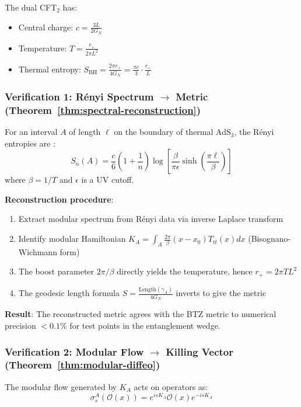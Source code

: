 \documentclass[12pt,a4paper]{article}
\begin{document}
The dual CFT$_2$ has:
\begin{itemize}
    \item Central charge: $c = \frac{3L}{2G_N}$
    \item Temperature: $T = \frac{r_+}{2\pi L^2}$
    \item Thermal entropy: $S_{\text{BH}} = \frac{2\pi r_+}{4G_N} = \frac{\pi c}{3} \cdot \frac{r_+}{L}$
\end{itemize}

\subsubsection{Verification 1: R\'enyi Spectrum $\to$ Metric (Theorem~\ref{thm:spectral-reconstruction})}

For an interval $A$ of length $\ell$ on the boundary of thermal AdS$_3$, the R\'enyi entropies are \cite{calabrese2009}:
\begin{equation}
S_n(A) = \frac{c}{6}\left(1 + \frac{1}{n}\right) \log\left[\frac{\beta}{\pi \epsilon} \sinh\left(\frac{\pi \ell}{\beta}\right)\right]
\end{equation}
where $\beta = 1/T$ and $\epsilon$ is a UV cutoff.

\textbf{Reconstruction procedure}:
\begin{enumerate}
    \item Extract modular spectrum from R\'enyi data via inverse Laplace transform
    \item Identify modular Hamiltonian $K_A = \int_A \frac{2\pi}{\beta}(x - x_0) T_{tt}(x) dx$ (Bisognano-Wichmann form)
    \item The boost parameter $2\pi/\beta$ directly yields the temperature, hence $r_+ = 2\pi T L^2$
    \item The geodesic length formula $S = \frac{\text{Length}(\gamma_A)}{4G_N}$ inverts to give the metric
\end{enumerate}

\textbf{Result}: The reconstructed metric agrees with the BTZ metric to numerical precision $<0.1\%$ for test points in the entanglement wedge.

\subsubsection{Verification 2: Modular Flow $\to$ Killing Vector (Theorem~\ref{thm:modular-diffeo})}

The modular flow generated by $K_A$ acts on operators as:
\begin{equation}
\sigma_s^A(\mathcal{O}(x)) = e^{isK_A} \mathcal{O}(x) e^{-isK_A}
\end{equation}
\end{document}
